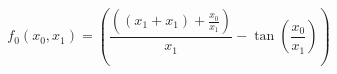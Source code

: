 \documentclass{article}
\begin{document}
\begin{equation}
f_0(x_0,x_1)=\left(\frac{\left(\left(x_1 + x_1\right) + \frac{x_0}{x_1}\right)}{x_1} -  \tan(\frac{x_0}{x_1} )\right)
\end{equation}
\end{document}
